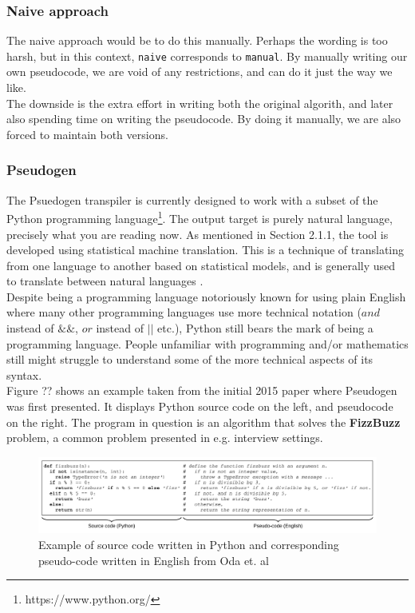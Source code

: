 \subsubsection{Naive approach}

The naive approach would be to do this manually. Perhaps the wording is too harsh, but in this context, \texttt{naive} corresponds to \texttt{manual}. By manually writing our own pseudocode, we are void of any restrictions, and can do it just the way we like. \\

The downside is the extra effort in writing both the original algorith, and later also spending time on writing the pseudocode. By doing it manually, we are also forced to maintain both versions.

\subsubsection{Pseudogen}

The Psuedogen transpiler is currently designed to work with a subset of the Python programming language\footnote{https://www.python.org/}. The output target is purely natural language, precisely what you are reading now. As mentioned in Section 2.1.1, the tool is developed using statistical machine translation. This is a technique of translating from one language to another based on statistical models, and is generally used to translate between natural languages \cite{DBLP:conf/kbse/OdaFNHSTN15}. \hfill \\

Despite being a programming language notoriously known for using plain English where many other programming languages use more technical notation ($and$ instead of $\&\&$, $or$ instead of $||$ etc.), Python still bears the mark of being a programming language. People unfamiliar with programming and/or mathematics still might struggle to understand some of the more technical aspects of its syntax. \hfill \\

Figure ?? shows an example taken from the initial 2015 paper where Pseudogen was first presented. It displays Python source code on the left, and pseudocode on the right. The program in question is an algorithm that solves the \textbf{FizzBuzz} problem, a common problem presented in e.g. interview settings. \hfill \\

\begin{figure}[ht]
    \centering
    \includegraphics[scale=0.52]{assets/odaetal.png}
    \caption{Example of source code written in Python and corresponding pseudo-code written in English from Oda et. al}
    \label{fig:odaetal}
\end{figure}

